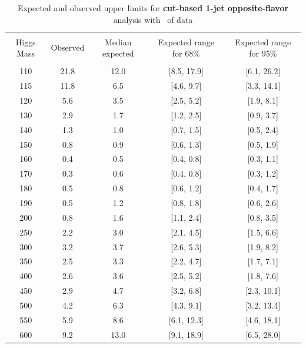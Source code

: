 \begin{table}[!hbp]
\begin{center}
\begin{tabular}{c c c c c}
\hline
\vspace{-3mm} && \\
 Higgs Mass   & Observed & Median expected & Expected range for 68\% & Expected range for 95\%   \\
\vspace{-3mm} && \\
\hline
110 & 21.8 & 12.0 & [8.5, 17.9] & [6.1, 26.2] \\
115 & 11.8 & 6.5 & [4.6, 9.7] & [3.3, 14.1] \\
120 & 5.6 & 3.5 & [2.5, 5.2] & [1.9, 8.1] \\
130 & 2.9 & 1.7 & [1.2, 2.5] & [0.9, 3.7] \\
140 & 1.3 & 1.0 & [0.7, 1.5] & [0.5, 2.4] \\
150 & 0.8 & 0.9 & [0.6, 1.3] & [0.5, 1.9] \\
160 & 0.4 & 0.5 & [0.4, 0.8] & [0.3, 1.1] \\
170 & 0.3 & 0.6 & [0.4, 0.8] & [0.3, 1.2] \\
180 & 0.5 & 0.8 & [0.6, 1.2] & [0.4, 1.7] \\
190 & 0.5 & 1.2 & [0.8, 1.8] & [0.6, 2.6] \\
200 & 0.8 & 1.6 & [1.1, 2.4] & [0.8, 3.5] \\
250 & 2.2 & 3.0 & [2.1, 4.5] & [1.5, 6.6] \\
300 & 3.2 & 3.7 & [2.6, 5.3] & [1.9, 8.2] \\
350 & 2.5 & 3.3 & [2.2, 4.7] & [1.7, 7.1] \\
400 & 2.6 & 3.6 & [2.5, 5.2] & [1.8, 7.6] \\
450 & 2.9 & 4.7 & [3.2, 6.8] & [2.3, 10.1] \\
500 & 4.2 & 6.3 & [4.3, 9.1] & [3.2, 13.4] \\
550 & 5.9 & 8.6 & [6.1, 12.3] & [4.6, 18.1] \\
600 & 9.2 & 13.0 & [9.1, 18.9] & [6.5, 28.0] \\
\hline
\end{tabular}
\caption{Expected and observed upper limits for {\bf cut-based 1-jet
    opposite-flavor} analysis with \intlumi\ of data}
\label{tab:of1_cut}
\end{center}
\end{table}

